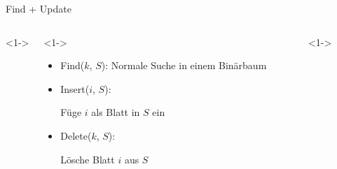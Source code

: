 \documentclass[t]{beamer}
\theoremstyle{plain}
\begin{document}
\begin{frame}{Find + Update}
    \begin{columns}<1->
    \begin{column}{.65\textwidth}<1->
        \begin{itemize}
            \item<1> Find($k$, $S$): Normale Suche in einem Binärbaum
            \item<2> Insert($i$, $S$):
                \begin{algorithm}[H]
                    Füge $i$ als Blatt in $S$ ein \;
                \end{algorithm}
            \item<3> Delete($k$, $S$):
                \begin{algorithm}[H]
                    Lösche Blatt $i$ aus $S$ \;
                \end{algorithm}
        \end{itemize}
    \end{column}
    \begin{column}{.35\textwidth}<1->
    \end{column}
    \end{columns}
\end{frame}
\end{document}
